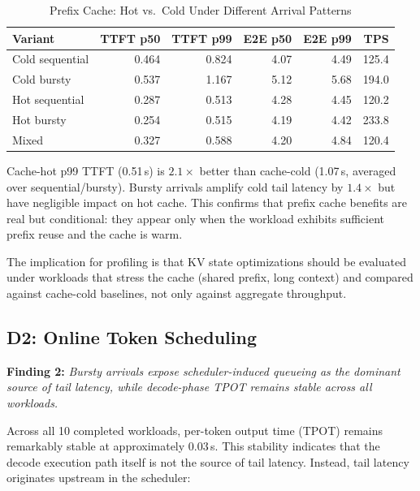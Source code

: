 \documentclass[conference]{IEEEtran}
\begin{document}
\begin{table}[htbp]
\caption{Prefix Cache: Hot vs.\ Cold Under Different Arrival Patterns}
\label{tab:prefix-cache}
\begin{center}
\small
\begin{tabular}{@{}lrrrrr@{}}
\toprule
\textbf{Variant} & \textbf{TTFT p50} & \textbf{TTFT p99} & \textbf{E2E p50} & \textbf{E2E p99} & \textbf{TPS} \\
\midrule
Cold sequential & 0.464 & 0.824 & 4.07 & 4.49 & 125.4 \\
Cold bursty     & 0.537 & 1.167 & 5.12 & 5.68 & 194.0 \\
Hot sequential  & 0.287 & 0.513 & 4.28 & 4.45 & 120.2 \\
Hot bursty      & 0.254 & 0.515 & 4.19 & 4.42 & 233.8 \\
Mixed           & 0.327 & 0.588 & 4.20 & 4.84 & 120.4 \\
\bottomrule
\end{tabular}
\end{center}
\end{table}

Cache-hot p99 TTFT (0.51\,s) is $2.1\times$ better than cache-cold (1.07\,s,
averaged over sequential/bursty). Bursty arrivals amplify cold tail latency by
$1.4\times$ but have negligible impact on hot cache. This confirms that prefix
cache benefits are real but conditional: they appear only when the workload
exhibits sufficient prefix reuse and the cache is warm.

The implication for profiling is that KV state optimizations should be
evaluated under workloads that stress the cache (shared prefix, long context)
and compared against cache-cold baselines, not only against aggregate
throughput.

\subsection{D2: Online Token Scheduling}
\label{sec:scheduling}

\textbf{Finding 2:} \emph{Bursty arrivals expose scheduler-induced queueing
as the dominant source of tail latency, while decode-phase TPOT remains
stable across all workloads.}

Across all 10 completed workloads, per-token output time (TPOT) remains
remarkably stable at approximately $0.03$\,s. This stability indicates that
the decode execution path itself is not the source of tail latency. Instead,
tail latency originates upstream in the scheduler:
\end{document}
